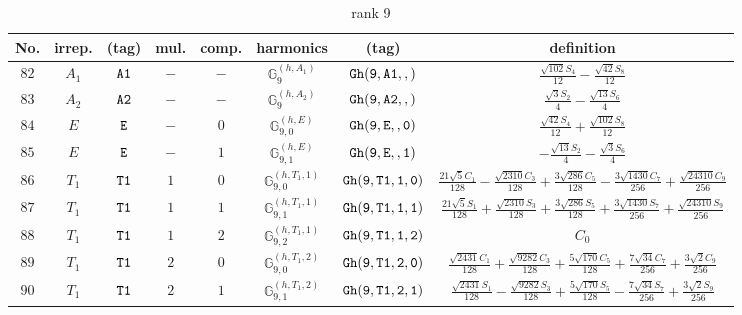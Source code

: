 \documentclass[fleqn,8pt]{jsarticle}
\begin{document}
\begin{table}[ht!]
\begin{center}
\caption{rank 9}
\renewcommand{\arraystretch}{1.3}
\begin{tabular}{cccccccc} \hline \hline
No. & irrep. & (tag) & mul. & comp. & harmonics & (tag) & definition \\ \hline
$ 82 $ & $ A_{1} $ & $ {\tt A1} $ & $ - $ & $ - $ & $ \mathbb{G}_{9}^{(h,A_{1})} $ & $ {\tt Gh(9,A1,,)} $ & $ \frac{\sqrt{102} S_{4}}{12} - \frac{\sqrt{42} S_{8}}{12} $ \\
$ 83 $ & $ A_{2} $ & $ {\tt A2} $ & $ - $ & $ - $ & $ \mathbb{G}_{9}^{(h,A_{2})} $ & $ {\tt Gh(9,A2,,)} $ & $ \frac{\sqrt{3} S_{2}}{4} - \frac{\sqrt{13} S_{6}}{4} $ \\
$ 84 $ & $ E $ & $ {\tt E} $ & $ - $ & $ 0 $ & $ \mathbb{G}_{9,0}^{(h,E)} $ & $ {\tt Gh(9,E,,0)} $ & $ \frac{\sqrt{42} S_{4}}{12} + \frac{\sqrt{102} S_{8}}{12} $ \\
$ 85 $ & $ E $ & $ {\tt E} $ & $ - $ & $ 1 $ & $ \mathbb{G}_{9,1}^{(h,E)} $ & $ {\tt Gh(9,E,,1)} $ & $ - \frac{\sqrt{13} S_{2}}{4} - \frac{\sqrt{3} S_{6}}{4} $ \\
$ 86 $ & $ T_{1} $ & $ {\tt T1} $ & $ 1 $ & $ 0 $ & $ \mathbb{G}_{9,0}^{(h,T_{1},1)} $ & $ {\tt Gh(9,T1,1,0)} $ & $ \frac{21 \sqrt{5} C_{1}}{128} - \frac{\sqrt{2310} C_{3}}{128} + \frac{3 \sqrt{286} C_{5}}{128} - \frac{3 \sqrt{1430} C_{7}}{256} + \frac{\sqrt{24310} C_{9}}{256} $ \\
$ 87 $ & $ T_{1} $ & $ {\tt T1} $ & $ 1 $ & $ 1 $ & $ \mathbb{G}_{9,1}^{(h,T_{1},1)} $ & $ {\tt Gh(9,T1,1,1)} $ & $ \frac{21 \sqrt{5} S_{1}}{128} + \frac{\sqrt{2310} S_{3}}{128} + \frac{3 \sqrt{286} S_{5}}{128} + \frac{3 \sqrt{1430} S_{7}}{256} + \frac{\sqrt{24310} S_{9}}{256} $ \\
$ 88 $ & $ T_{1} $ & $ {\tt T1} $ & $ 1 $ & $ 2 $ & $ \mathbb{G}_{9,2}^{(h,T_{1},1)} $ & $ {\tt Gh(9,T1,1,2)} $ & $ C_{0} $ \\
$ 89 $ & $ T_{1} $ & $ {\tt T1} $ & $ 2 $ & $ 0 $ & $ \mathbb{G}_{9,0}^{(h,T_{1},2)} $ & $ {\tt Gh(9,T1,2,0)} $ & $ \frac{\sqrt{2431} C_{1}}{128} + \frac{\sqrt{9282} C_{3}}{128} + \frac{5 \sqrt{170} C_{5}}{128} + \frac{7 \sqrt{34} C_{7}}{256} + \frac{3 \sqrt{2} C_{9}}{256} $ \\
$ 90 $ & $ T_{1} $ & $ {\tt T1} $ & $ 2 $ & $ 1 $ & $ \mathbb{G}_{9,1}^{(h,T_{1},2)} $ & $ {\tt Gh(9,T1,2,1)} $ & $ \frac{\sqrt{2431} S_{1}}{128} - \frac{\sqrt{9282} S_{3}}{128} + \frac{5 \sqrt{170} S_{5}}{128} - \frac{7 \sqrt{34} S_{7}}{256} + \frac{3 \sqrt{2} S_{9}}{256} $ \\

\end{tabular}
\end{center}
\end{table}
\end{document}

